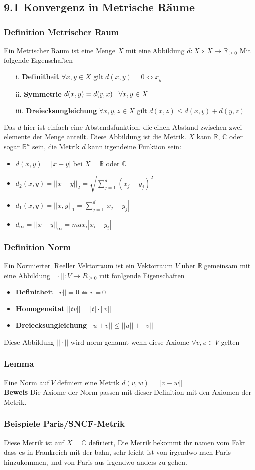 \documentclass{article}
\newcommand{\smspc}{\hspace{0.3cm}}
\newcommand{\beweis}{\\\textbf{Beweis }}
\newcommand{\beispiel}[1]{\subsubsection*{Beispiele {#1}}}
\newcommand{\lemma}[1]{\subsubsection*{Lemma {#1}}}
\newcommand{\definition}[1]{\subsubsection*{Definition {#1}}}
\begin{document}
\subsection*{9.1 Konvergenz in Metrische Räume}
\definition{Metrischer Raum} Ein Metrischer Raum ist eine Menge $X$ mit eine Abbildung $d:X\times X\rightarrow \mathbb{R}_{\ge 0}$ Mit folgende Eigenschaften
\begin{itemize}
  \item[i.]{\textbf{Definitheit} $\forall x,y\in X$ gilt $d(x,y)=0\Leftrightarrow x_y$}
  \item[ii.]{\textbf{Symmetrie} $d(x,y)=d(y,x)\smspc\forall x,y\in X$}
  \item[iii.]{\textbf{Dreiecksungleichung} $\forall x,y,z\in X$ gilt $d(x,z)\le d(x,y)+d(y,z)$}
\end{itemize}
Das $d$ hier ist einfach eine Abstandsfunktion, die einen Abstand zwischen zwei elemente der Menge anteilt. Diese Abbildung ist die Metrik.
$X$ kann $\mathbb{R}$, $\mathbb{C}$ oder sogar $\mathbb{R}^n$ sein, die Metrik $d$ kann irgendeine Funktion sein:
\begin{itemize}
  \item{$d(x,y)=|x-y|$ bei $X=\mathbb{R}$ oder $\mathbb{C}$}
  \item{$d_2(x,y)=||x-y||_2=\sqrt{\sum_{j=1}^d (x_j-y_j)^2}$}
  \item{$d_1(x,y)=||x,y||_1=\sum_{j=1}^d|x_j-y_j|$}
  \item{$d_\infty=||x-y||_\infty=max_i|x_i-y_i|$}
\end{itemize}
\definition{Norm} Ein Normierter, Reeller Vektorraum ist ein Vektorraum $V$ uber $\mathbb{R}$ gemeinsam mit eine Abbildung $||\cdot||:V\rightarrow R_{\ge0}$ mit fonlgende Eigenschaften
\begin{itemize}
  \item{\textbf{Definitheit} $||v||=0\Leftrightarrow v=0$}
  \item{\textbf{Homogeneitat} $||tv||=|t|\cdot||v||$}
  \item{\textbf{Dreiecksungleichung} $||u+v||\le||u||+||v||$}
\end{itemize}
Diese Abbildung $||\cdot||$ wird norm genannt wenn diese Axiome $\forall v,u\in V$ gelten
\lemma{}Eine Norm auf $V$ definiert eine Metrik $d(v,w)=||v-w||$ \beweis Die Axiome der Norm passen mit dieser Definition mit den Axiomen der Metrik.
\beispiel{Paris/SNCF-Metrik}
Diese Metrik ist auf $X=\mathbb{C}$ definiert, Die Metrik bekommt ihr namen vom Fakt dass es in Frankreich mit der bahn, sehr leicht ist von irgendwo nach Paris hinzukommen, und von Paris aus irgendwo anders zu gehen.
\end{document}
